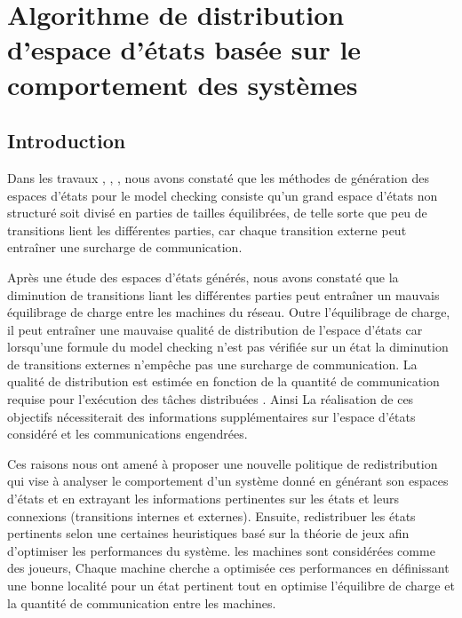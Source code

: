 \chapter{Algorithme de distribution d’espace d’états basée sur le comportement des systèmes}

 \section{Introduction}
Dans les travaux \citep{Saidouni2012}, \citep{TabibSaidouni2016}, \citep{BENSETIRA2017}, nous avons constaté que les méthodes de génération des espaces d’états pour le model checking consiste  qu’un grand espace d'états non structuré soit divisé en parties de tailles équilibrées, de telle sorte que peu de transitions lient les différentes  parties, car chaque transition externe peut entraîner une surcharge de communication.

Après une étude des espaces d'états générés, nous avons constaté que la diminution de transitions liant les différentes parties peut entraîner un mauvais équilibrage de charge entre les machines du réseau. Outre l’équilibrage de charge, il peut entraîner une mauvaise qualité de distribution de l'espace d'états car lorsqu'une formule du model checking n'est pas vérifiée sur un état la diminution de transitions externes n'empêche pas une surcharge de communication. La qualité de distribution est estimée en fonction de la quantité de communication requise pour l’exécution des tâches distribuées \citep{EzekielLuttgen2008}. Ainsi La réalisation de ces objectifs nécessiterait des informations supplémentaires sur l’espace d’états considéré et les communications engendrées. 

Ces raisons nous ont amené à proposer une nouvelle politique de redistribution qui vise à analyser le comportement d’un système donné en générant son espaces d’états et en extrayant les informations pertinentes sur les états et leurs connexions (transitions internes et externes). Ensuite, redistribuer les états pertinents selon une certaines heuristiques basé sur la théorie de jeux afin d’optimiser les performances du système. les machines sont considérées comme des joueurs, Chaque machine cherche a optimisée ces performances en définissant une bonne localité pour un état pertinent tout en optimise l’équilibre de charge et la quantité de communication entre les machines.
 
